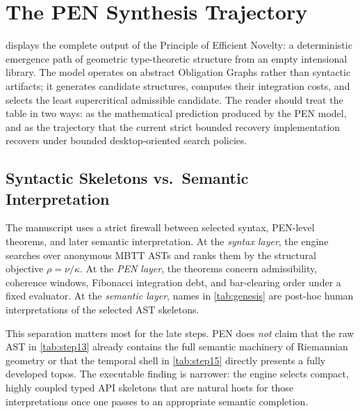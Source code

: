 \documentclass[11pt,a4paper]{article}
\theoremstyle{plain}
\theoremstyle{definition}
\theoremstyle{remark}
\begin{document}
\section{The PEN Synthesis Trajectory}
\label{sec:genesis}

 displays the complete output of the Principle of Efficient Novelty: a deterministic emergence path of geometric type-theoretic structure from an empty intensional library.
The model operates on abstract Obligation Graphs rather than syntactic artifacts; it generates candidate structures, computes their integration costs, and selects the least supercritical admissible candidate.
The reader should treat the table in two ways: as the mathematical prediction produced by the PEN model, and as the trajectory that the current strict bounded recovery implementation recovers under bounded desktop-oriented search policies.

\subsection{Syntactic Skeletons vs.\ Semantic Interpretation}
\label{sec:semantic-firewall}

The manuscript uses a strict firewall between selected syntax, PEN-level theorems, and later semantic interpretation.
At the \emph{syntax layer}, the engine searches over anonymous MBTT ASTs and ranks them by the structural objective $\rho = \nu/\kappa$.
At the \emph{PEN layer}, the theorems concern admissibility, coherence windows, Fibonacci integration debt, and bar-clearing order under a fixed evaluator.
At the \emph{semantic layer}, names in \cref{tab:genesis} are post-hoc human interpretations of the selected AST skeletons.

This separation matters most for the late steps.
PEN does \emph{not} claim that the raw AST in \cref{tab:step13} already contains the full semantic machinery of Riemannian geometry or that the temporal shell in \cref{tab:step15} directly presents a fully developed topos.
The executable finding is narrower: the engine selects compact, highly coupled typed API skeletons that are natural hosts for those interpretations once one passes to an appropriate semantic completion.
\end{document}
